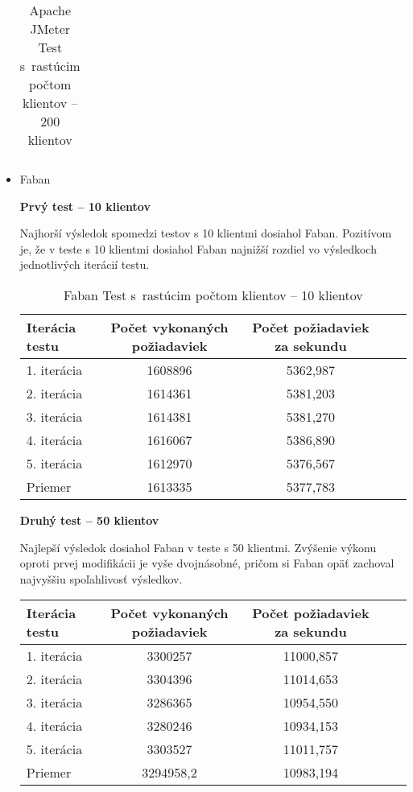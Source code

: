 \documentclass[12pt,oneside,final]{fithesis-utf8}
\begin{document}
\begin{itemize}
\begin{table}[H]
\begin{center}
\begin{tabular}{ | l | c | c | c | c |}
\end{tabular}
\end{center}
\caption{Apache JMeter Test s~rastúcim počtom klientov -- 200 klientov}
\end{table}

\item Faban

\textbf{Prvý test -- 10 klientov}

Najhorší výsledok spomedzi testov s 10 klientmi dosiahol Faban. Pozitívom je, že v teste s 10 klientmi dosiahol Faban najnižší rozdiel vo výsledkoch jednotlivých iterácií testu.

\begin{table}[H]
\begin{center}
\begin{tabular}{ | l | c | c | c | c |}
		\hline
		 \textbf{Iterácia testu} & \textbf{Počet vykonaných požiadaviek} & \textbf{Počet požiadaviek za sekundu} \\ \hline
		 1. iterácia & 1608896 & 5362,987 \\ \hline
		 2. iterácia & 1614361 & 5381,203 \\ \hline
		 3. iterácia & 1614381 & 5381,270 \\ \hline
		 4. iterácia & 1616067 & 5386,890 \\ \hline
		 5. iterácia & 1612970 & 5376,567 \\ \hline
		 Priemer & 1613335 & 5377,783 \\ \hline
		 
\end{tabular}
\end{center}
\caption{Faban Test s~rastúcim počtom klientov -- 10 klientov}
\end{table}

\textbf{Druhý test -- 50 klientov}

Najlepší výsledok dosiahol Faban v teste s 50 klientmi. Zvýšenie výkonu oproti prvej modifikácii je vyše dvojnásobné, pričom si Faban opäť zachoval najvyššiu spoľahlivosť výsledkov. 

\begin{table}[H]
\begin{center}
\begin{tabular}{ | l | c | c | c | c |}
		\hline
		 \textbf{Iterácia testu} & \textbf{Počet vykonaných požiadaviek} & \textbf{Počet požiadaviek za sekundu} \\ \hline
		 1. iterácia & 3300257 & 11000,857 \\ \hline
		 2. iterácia & 3304396 & 11014,653 \\ \hline
		 3. iterácia & 3286365 & 10954,550 \\ \hline
		 4. iterácia & 3280246 & 10934,153 \\ \hline
		 5. iterácia & 3303527 & 11011,757 \\ \hline
		 Priemer & 3294958,2 & 10983,194 \\ \hline
		 

\end{tabular}
\end{center}
\end{table}
\end{itemize}
\end{document}
